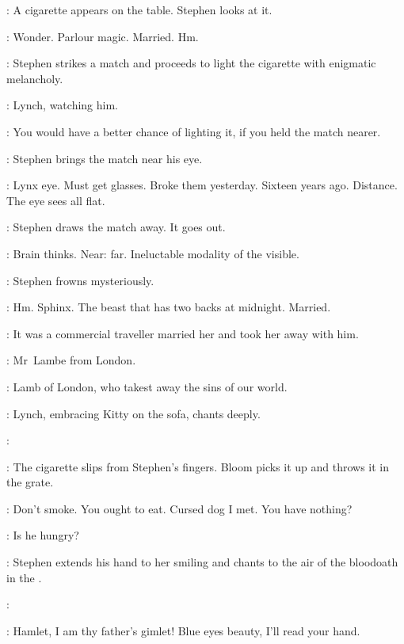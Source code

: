 :
A cigarette appears on the table.
Stephen looks at it.

\Stephen:
Wonder.
Parlour magic.
Married.
Hm.

:
Stephen strikes a match and proceeds
to light the cigarette with enigmatic melancholy.

:
Lynch, watching him.

\Lynch:
You would have a better chance of lighting it,
if you held the match nearer.

:
Stephen brings the match near his eye.

\Stephen:
Lynx eye.
Must get glasses.
Broke them yesterday.
Sixteen years ago.
Distance.
The eye sees all flat.

:
Stephen draws the match away.
It goes out.

\Stephen:
Brain thinks.
Near: far.
Ineluctable modality of the visible.

:
Stephen frowns mysteriously.

\Stephen:
Hm.
Sphinx.
The beast that has two backs at midnight.
Married.

\Zoe:
It was a commercial traveller married her and took her away with him.

\Florry:
Mr~Lambe from London.

\Stephen:
Lamb of London, who takest away the sins of our world.

:
Lynch, embracing Kitty on the sofa, chants deeply.

\Lynch:

:
The cigarette slips from Stephen's fingers.
Bloom picks it up and throws it in the grate.

\Bloom:
Don't smoke.
You ought to eat.
Cursed dog I met.
You have nothing?

\Zoe:
Is he hungry?

:
Stephen extends his hand to her smiling
and chants to the air of the bloodoath in the .

\Stephen:
\begin{verse}
\end{verse}

\Zoe:
Hamlet, I am thy father's gimlet!
Blue eyes beauty, I'll read your hand.

